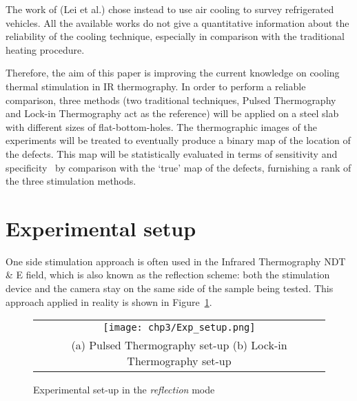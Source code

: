 The work of (Lei et al.)\citet{lei2017detection} chose instead to use air cooling to survey refrigerated vehicles. All the available works do not give a quantitative information about the reliability of the cooling technique, especially in comparison with the traditional heating procedure.

Therefore, the aim of this paper is improving the current knowledge on cooling thermal stimulation
in IR thermography. In order to perform a reliable comparison, three methods (two traditional techniques, Pulsed Thermography and Lock-in Thermography act as the reference) will be applied on a steel slab with different sizes of flat-bottom-holes. The thermographic images of the experiments will be  treated to  eventually produce a binary map of the location of the defects. This map will be statistically evaluated in terms of sensitivity and specificity~\citet{Fawcett2006} by comparison with the `true' map of the defects, furnishing a rank of the three stimulation methods. 

\section{Experimental setup} %
\label{sec:experimental_setup}
One side stimulation approach is often used in the Infrared Thermography NDT \& E field, which is also known as the reflection scheme: both the stimulation device and the camera stay on the same side of the sample being tested. This approach applied in reality is shown in Figure~\ref{Exp_setup}.

\begin{figure}[ht]
   \hspace{-0.95cm}
   \begin{tabular}{c}
   \texttt{[image: chp3/Exp\_setup.png]}
   \\
   \footnotesize{(a) Pulsed Thermography set-up} \hspace{4cm} \footnotesize{(b) Lock-in Thermography set-up}   
   \end{tabular}  
   \caption{Experimental set-up in the \textit{reflection} mode}
   \label{Exp_setup}
\end{figure}

